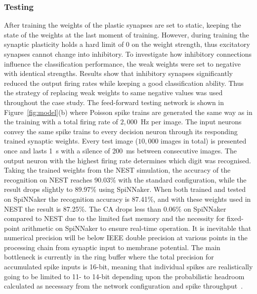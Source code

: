 \documentclass{frontiersENG} %
\begin{document}
\subsubsection{Testing}
After training the weights of the plastic synapses are set to static, keeping the state of the weights at the last moment of training.
However, during training the synaptic plasticity holds a hard limit of 0 on the weight strength, thus excitatory synapses cannot change into inhibitory.
To investigate how inhibitory connections influence the classification performance, the weak weights were set to negative with identical strengths.
Results show that inhibitory synapses significantly reduced the output firing rates while keeping a good classification ability.
Thus the strategy of replacing weak weights to same negative values was used throughout the case study.
The feed-forward testing network is shown in Figure~\ref{fig:model}(b) where Poisson spike trains are generated the same way as in the training with a total firing rate of $2,000$~Hz per image.
The input neurons convey the same spike trains to every decision neuron through its responding trained synaptic weights. 
Every test image ($10,000$ images in total) is presented once and lasts 1~s with a silence of 200~ms between consecutive images.
The output neuron with the highest firing rate determines which digit was recognised.
Taking the trained weights from the NEST simulation, the accuracy of the recognition on NEST reaches 90.03\% with the standard configuration, while the result drops slightly to 89.97\% using SpiNNaker.
When both trained and tested on SpiNNaker the recognition accuracy is 87.41\%, and with these weights used in NEST the result is 87.25\%. 
The CA drops less than $0.06\%$ on SpiNNaker compared to NEST due to the limited fast memory and the necessity for fixed-point arithmetic on SpiNNaker to ensure real-time operation.
It is inevitable that numerical precision will be below IEEE double precision at various points in the processing chain from synaptic input to membrane potential.
The main bottleneck is currently in the ring buffer where the total precision for accumulated spike inputs is 16-bit, meaning that individual spikes are realistically going to be limited to 11- to 14-bit depending upon the probabilistic headroom calculated as necessary from the network configuration and spike throughput~\citep{Hopkins2015Accuracy}.
\end{document}
